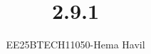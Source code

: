 \documentclass[journal]{IEEEtran}
\begin{document}

\vspace{3cm}
\title{2.9.1}
\author{EE25BTECH11050-Hema Havil}
\maketitle
	{\let\newpage\relax\maketitle}
	
	\renewcommand{\thefigure}{\theenumi}
	\renewcommand{\thetable}{\theenumi}
	\setlength{\intextsep}{12pt} %
	
	\renewcommand{\thetable}{\theenumi}
	
\end{document}

